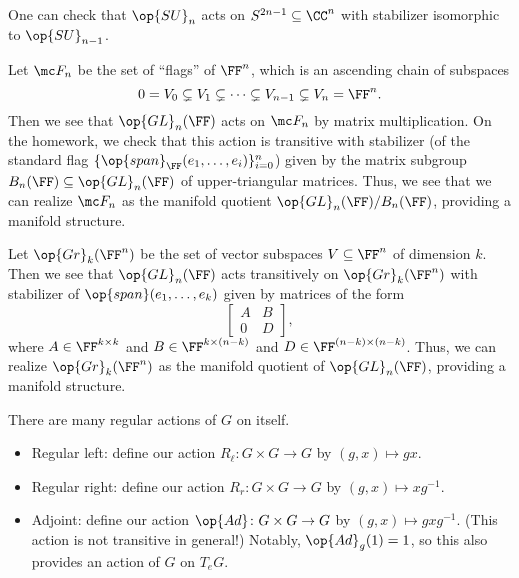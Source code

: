 \documentclass[../notes.tex]{subfiles}
\begin{document}
\begin{example}
	One can check that $\op{SU}_n$ acts on $S^{2n-1}\subseteq\CC^n$ with stabilizer isomorphic to $\op{SU}_{n-1}$.\todo{}
\end{example}
\begin{example}
	Let $\mc F_n$ be the set of ``flags'' of $\FF^n$, which is an ascending chain of subspaces
	\[0=V_0\subsetneq V_1\subsetneq\cdots\subsetneq V_{n-1}\subsetneq V_n=\FF^n.\]
	Then we see that $\op{GL}_n(\FF)$ acts on $\mc F_n$ by matrix multiplication. On the homework, we check that this action is transitive with stabilizer (of the standard flag $\{\op{span}_\FF(e_1,\ldots,e_i)\}_{i=0}^n$) given by the matrix subgroup $B_n(\FF)\subseteq\op{GL}_n(\FF)$ of upper-triangular matrices. Thus, we see that we can realize $\mc F_n$ as the manifold quotient $\op{GL}_n(\FF)/B_n(\FF)$, providing a manifold structure.
\end{example}
\begin{example}[Grassmannians]
	Let $\op{Gr}_k(\FF^n)$ be the set of vector subspaces $V\subseteq\FF^n$ of dimension $k$. Then we see that $\op{GL}_n(\FF)$ acts transitively on $\op{Gr}_k(\FF^n)$ with stabilizer of $\op{span}(e_1,\ldots,e_k)$ given by matrices of the form
	\[\begin{bmatrix}
		A & B \\
		0 & D
	\end{bmatrix},\]
	where $A\in\FF^{k\times k}$ and $B\in\FF^{k\times(n-k)}$ and $D\in\FF^{(n-k)\times(n-k)}$. Thus, we can realize $\op{Gr}_k(\FF^n)$ as the manifold quotient of $\op{GL}_n(\FF)$, providing a manifold structure.
\end{example}
\begin{example}
	There are many regular actions of $G$ on itself.
	\begin{itemize}
		\item Regular left: define our action $R_\ell\colon G\times G\to G$ by $(g,x)\mapsto gx$.
		\item Regular right: define our action $R_r\colon G\times G\to G$ by $(g,x)\mapsto xg^{-1}$.
		\item Adjoint: define our action $\op{Ad}\colon G\times G\to G$ by $(g,x)\mapsto gxg^{-1}$. (This action is not transitive in general!) Notably, $\op{Ad}_g(1)=1$, so this also provides an action of $G$ on $T_eG$.
	\end{itemize}
\end{example}
\end{document}
